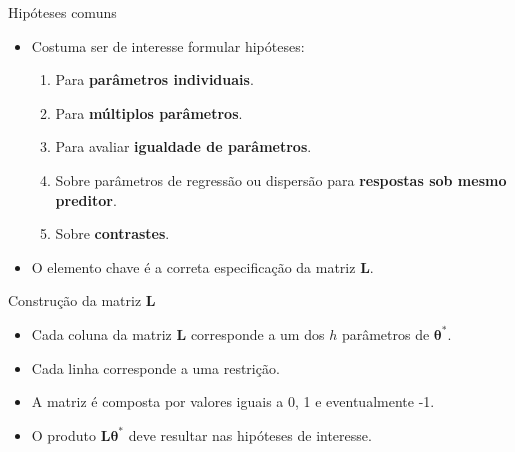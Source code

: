 \documentclass[
  ignorenonframetext,
  serif,
  professionalfont,
  usenames,
  dvipsnames,
  aspectratio = 169]{beamer}
\begin{document}
\begin{frame}{Hipóteses comuns}
\protect\hypertarget{hipuxf3teses-comuns}{}
\begin{itemize}
  \itemsep 2ex
  
  \item Costuma ser de interesse formular hipóteses:
    \begin{enumerate}
      \itemsep 1ex
      \item Para \textbf{parâmetros individuais}.
      \item Para \textbf{múltiplos parâmetros}.
      \item Para avaliar \textbf{igualdade de parâmetros}.
      \item Sobre parâmetros de regressão ou dispersão para \textbf{respostas sob mesmo preditor}.
      \item Sobre \textbf{contrastes}.
\end{enumerate}
  
  \item O elemento chave é a correta especificação da matriz $\boldsymbol{L}$.
  
\end{itemize}
\end{frame}

\begin{frame}{Construção da matriz \(\boldsymbol{L}\)}
\protect\hypertarget{construuxe7uxe3o-da-matriz-boldsymboll}{}
\begin{itemize}
  \itemsep 2ex
  
  \item Cada coluna da matriz $\boldsymbol{L}$ corresponde a um dos $h$ parâmetros de $\boldsymbol{\theta^{*}}$. 
  
  \item Cada linha corresponde a uma restrição. 

  \item A matriz é composta por valores iguais a 0, 1 e eventualmente -1.
  
  \item O produto $\boldsymbol{L}\boldsymbol{\theta^{*}}$ deve resultar nas hipóteses de interesse.

\end{itemize}
\end{frame}
\end{document}

